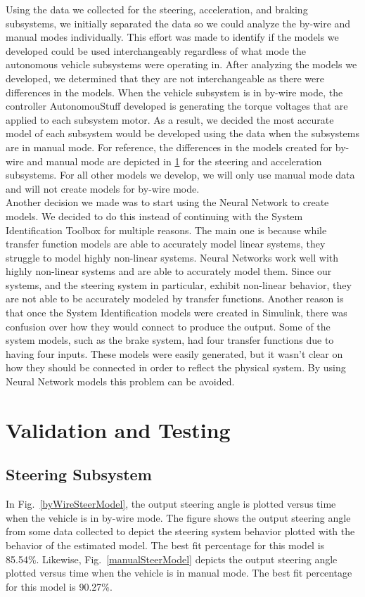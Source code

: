 \documentclass[journal,twoside,web]{ieeecolor}
\begin{document}
Using the data we collected for the steering, acceleration, and braking subsystems, we initially separated the data so we could analyze the by-wire and manual modes individually. This effort was made to identify if the models we developed could be used interchangeably regardless of what mode the autonomous vehicle subsystems were operating in. After analyzing the models we developed, we determined that they are not interchangeable as there were differences in the models. When the vehicle subsystem is in by-wire mode, the controller AutonomouStuff developed is generating the torque voltages that are applied to each subsystem motor. As a result, we decided the most accurate model of each subsystem would be developed using the data when the subsystems are in manual mode. For reference, the differences in the models created for by-wire and manual mode are depicted in \ref{sec:simresults} for the steering and acceleration subsystems. For all other models we develop, we will only use manual mode data and will not create models for by-wire mode.
\\

Another decision we made was to start using the Neural Network to create models. We decided to do this instead of continuing with the System Identification Toolbox for multiple reasons. The main one is because while transfer function models are able to accurately model linear systems, they struggle to model highly non-linear systems. Neural Networks work well with highly non-linear systems and are able to accurately model them. Since our systems, and the steering system in particular, exhibit non-linear behavior, they are not able to be accurately modeled by transfer functions. Another reason is that once the System Identification models were created in Simulink, there was confusion over how they would connect to produce the output. Some of the system models, such as the brake system, had four transfer functions due to having four inputs. These models were easily generated, but it wasn’t clear on how they should be connected in order to reflect the physical system. By using Neural Network models this problem can be avoided.



\section{Validation and Testing} \label{sec:simresults}
\subsection{Steering Subsystem}
In Fig.~\ref{byWireSteerModel}, the output steering angle is plotted versus time
when the vehicle is in by-wire mode. The figure shows the output steering angle
from some data collected to depict the steering system behavior plotted with the
behavior of the estimated model. The best fit percentage for this model is
85.54\%. Likewise, Fig.~\ref{manualSteerModel} depicts the output steering angle
plotted versus time when the vehicle is in manual mode. The best fit percentage
for this model is 90.27\%.
\end{document}
